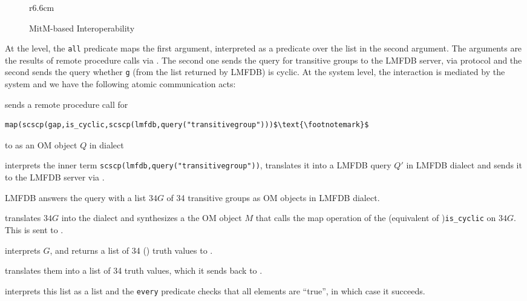 \begin{oldpart}
\begin{wrapfigure}r{6.6cm}\vspace*{-2em}
  \vspace*{-1em}
  \caption{MitM-based Interoperability}\label{fig:mitmcomm}\vspace*{-1em}
\end{wrapfigure}
At the \Sage level, the \lstinline|all| predicate 
 maps the first argument, interpreted as a predicate over the list in the second argument. 
The arguments are the results of remote procedure calls via \SCSCP. 
The second one sends the query for transitive groups to the LMFDB \SCSCP server, via \SCSCP protocol and the second sends the query whether \lstinline|g| (from the list returned by LMFDB) is cyclic.
At the system level, the interaction is mediated by the \MMT system and we have the following atomic communication acts: 
\begin{compactenum}
\item \Sage sends a \SCSCP remote procedure call for 
  \begin{lstlisting}[mathescape]
    map(scscp(gap,is_cyclic,scscp(lmfdb,query("transitivegroup")))$\text{\footnotemark}$
\end{lstlisting}
    to \MMT as an OM object $Q$ in \Sage
  dialect
\item \MMT interprets the inner term \lstinline|scscp(lmfdb,query("transitivegroup"))|, translates it into a LMFDB query $Q'$ in LMFDB dialect and sends it to the LMFDB \SCSCP server via \SCSCP. 
\item LMFDB answers the query with a list $34G$ of 34 transitive groups as OM objects in LMFDB dialect.
\item \MMT translates $34G$ into the \GAP dialect and synthesizes a the OM object $M$ that calls the \GAP map operation of the (\GAP equivalent of )\lstinline|is_cyclic| on $34G$. This is sent to \GAP. 
\item \GAP interprets $G$, and returns a list of 34 (\GAP) truth values to \MMT. 
\item \MMT translates them into a list of 34 \Sage truth values, which it sends back to \Sage. 
\item \Sage interprets this list as a \Sage list and the \lstinline|every| predicate checks that all elements are ``true'', in which case it succeeds. 
\end{compactenum}
\end{oldpart}

